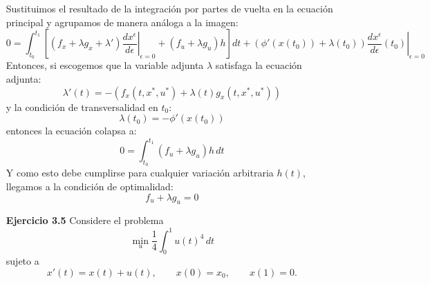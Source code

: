 \documentclass{uofa-eng-assignment}
\begin{document}
\begin{enumerate}
Sustituimos el resultado de la integración por partes de vuelta en la ecuación principal y agrupamos de manera análoga a la imagen:$$0 = \int_{t_0}^{t_1} \left[ (f_x + \lambda g_x + \lambda') \left. \frac{dx^\epsilon}{d\epsilon} \right|_{\epsilon=0} + (f_u + \lambda g_u)h \right] dt + \left( \phi'(x(t_0)) + \lambda(t_0) \right) \left. \frac{dx^\epsilon}{d\epsilon} (t_0) \right|_{\epsilon=0}$$
Entonces, si escogemos que la variable adjunta $\lambda$ satisfaga la ecuación adjunta:$$\lambda'(t) = -\left( f_x(t, x^*, u^*) + \lambda(t) g_x(t, x^*, u^*) \right)$$y la condición de transversalidad en $t_0$:$$\lambda(t_0) = -\phi'(x(t_0))$$
entonces la ecuación colapsa a:$$0 = \int_{t_0}^{t_1} (f_u + \lambda g_u) h \, dt$$Y como esto debe cumplirse para cualquier variación arbitraria $h(t)$, llegamos a la condición de optimalidad:$$f_u + \lambda g_u = 0$$
\item[\textbf{Ejercicio 3.5}] Considere el problema
\[
\min_{u} \frac{1}{4}\int_0^1 u(t)^4\,dt
\]
sujeto a
\[
x'(t) = x(t) + u(t), \qquad x(0) = x_0, \qquad x(1) = 0.
\]



\end{enumerate}
\end{document}
